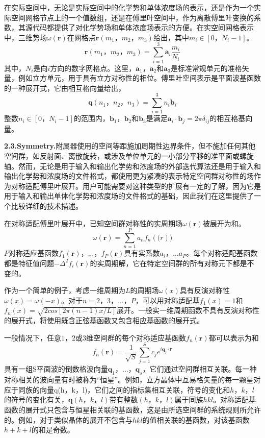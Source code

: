 \documentclass[12pt，a4paper]{article}
\numberwithin{equation}{section}
\begin{document}
在实际空间中，无论是实际空间中的化学势和单体浓度场的表示，还是作为一个实际空间网格节点上的一个值数组，还是在傅里叶空间中，作为离散傅里叶变换的系数，其源代码都提供了对化学势场和单体浓度场表示的方便。在实空间网格表示中，三维势场$\omega (\mathbf{r})$在网格点$\mathbf{r}(m_1，m_2，m_3)$给出，其中$m_i \in \left[ 0，N_i-1 \right]$。
\begin{equation}\label{8}
\mathbf{r}(m_1，m_2，m_3)=\sum _{i=1}^{3}\mathbf{a}_i \frac{m_i}{N_i}
\end{equation}
其中，$N_i$是向$i$方向的数字网格点。这里，$\mathbf{a}_1，\mathbf{a}_2$和$\mathbf{a}_3$是标准常规单元的准格矢量，例如立方单元，用于具有立方对称性的相位。傅里叶空间表示是平面波基函数的一种展开式，它由相互格向量给出，
\begin{equation}\label{9}
\mathbf{q}(n_1，n_2，n_3)=\sum _{i=1}^{3}n_i\mathbf{b}_i
\end{equation}
整数$n_i\in [0，N_i−1]$的范围内，$\mathbf{b}_1，\mathbf{b}_2$和$\mathbf{b}_3$是满足$\mathbf{a}_i \cdot \mathbf{b}_j=2\pi \delta _{ij}$的相互格基向量。

\textbf{2.3.Symmetry.}附属器使用的空间等距施加周期性边界条件，但不施加任何其他空间群，如反射面、离散旋转，或涉及单位单元的一小部分平移的准平面或螺旋轴。然而，无论是用于输入和输出化学势和浓度场的外部迭代算法还是用于输入和输出化学势和浓度场的文件格式，都使用更为紧凑的表示特定空间群对称性的场作为对称适配傅里叶展开。用户可能需要对这种类型的扩展有一定的了解，因为它是用于输入和输出单体化学势和浓度场的文件格式的基础，因此我们在这里提供了一个比较详细的技术描述。

在对称适配傅里叶展开中，已知空间群对称性的实周期场$\omega (\mathbf{r})$被展开为和。
\begin{equation}\label{10}
\omega (\mathbf{r})=\sum _{n=1}^{P} a_nf_n(\mathbf(r))
\end{equation}
$P$对称适应基函数$f_1(\mathbf{r})，...，f_P(\mathbf{r})$具有实系数$a_i，...a_P$。每个对称适配基函数都是特征值问题$-\Delta ^2f_i(\mathbf{r})$的实周期解，它在特定空间群的所有对称元下都是不变的。

作为一个简单的例子，考虑一维周期为$L$的周期场$\omega (x)$具有反演对称性$\omega(x)=\omega(-x)$。对于$n=2，3，...，P$，可以用对称适配基$f_1(x)=1$和$f_n(x)=\sqrt{2cos\left[ 2\pi (n-1)x/L \right]}$展开。一般实一维周期函数不具有反演对称性的展开式，将使用既含正弦基函数又包含相应基函数的展开式。

一般情况下，任意$1，2$或$3$维空间群的每个对称适应基函数$f_n(\mathbf{r})$都可以表示为和
\begin{equation}\label{11}
f_n(\mathbf{r})=\frac{1}{\sqrt{S}}\sum_{j=1}^{S}c_je^{i\mathbf{q}_j\cdot \mathbf{r}}
\end{equation}
具有一组S平面波的倒数格波向量$\mathbf{q}_1，...，\mathbf{q}_s$，它们通过空间群相互关联。每一种对称相关的波向量有时被称为“恒星”。例如，立方晶体中互易格矢量的每一颗星对应于同族{}的向量q(h，k，l)，它们之间的指标集相互关联，符号的变化和$h，k，l$的符号的变化有关，$\mathbf{q}(h，k，l)$带有整数$(h，k，l)$属于同族${hkl}$。对称适配基函数的展开式只包含与恒星相关联的基函数，这是由所选空间群的系统规则所允许的。例如，对于类似晶体的展开不包含与${hkl}$的值相关联的基函数，对该基函数$h+k+l$的和是奇数。
\end{document}
